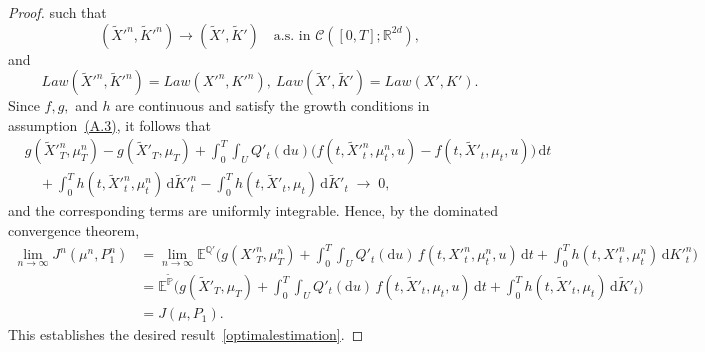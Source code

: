 \documentclass[10pt,a4paper]{amsart}
\begin{document}
\begin{proof}
such that
\begin{equation*}
(\tilde{X}'^n, \tilde{K}'^n)
\to
(\tilde{X}', \tilde{K}')
\quad 
\text{a.s. in } 
\mathcal{C}([0,T]; \mathbb{R}^{2d}),
\end{equation*}
and
\begin{equation*}
Law(\tilde{X}'^n, \tilde{K}'^n)
= 
Law(X'^n, K'^n),
\ 
Law(\tilde{X}', \tilde{K}')
= 
Law(X', K').
\end{equation*}
Since $ f, g, $ and $ h $ are continuous and satisfy the growth conditions in assumption~\hyperlink{A.3}{(A.3)}, 
it follows that
\begin{align*}
& g(\tilde{X}'^n_T, \mu^n_T) - g(\tilde{X}'_T, \mu_T)
+ 
\int_0^T\int_U 
Q'_t(\mathrm{d}u)
\big(f(t, \tilde{X}'^n_t, \mu^n_t, u)
    - f(t, \tilde{X}'_t, \mu_t, u)\big)\,\mathrm{d}t
\\
&\quad 
+ 
\int_0^T 
h(t, \tilde{X}'^n_t, \mu^n_t)\,\mathrm{d}\tilde{K}'^n_t
- 
\int_0^T 
h(t, \tilde{X}'_t, \mu_t)\,\mathrm{d}\tilde{K}'_t
\;\longrightarrow\; 0,
\end{align*}
and the corresponding terms are uniformly integrable. 
Hence, by the dominated convergence theorem,
\begin{align*}
\lim_{n \to \infty} J^n(\mu^n, P^n_1)
&= 
\lim_{n \to \infty}
\mathbb{E}^{\mathbb{Q}'}
\Bigg(
g(X'^n_T, \mu^n_T)
+ 
\int_0^T\int_U 
Q'_t(\mathrm{d}u)\,
f(t, X'^n_t, \mu^n_t, u)\,\mathrm{d}t
+ 
\int_0^T 
h(t, X'^n_t, \mu^n_t)\,
\mathrm{d}K'^n_t
\Bigg)
\\[3pt]
&= 
\mathbb{E}^{\tilde{\mathbb{P}}}
\Bigg(
g(\tilde{X}'_T, \mu_T)
+ 
\int_0^T \int_U 
Q'_t(\mathrm{d}u)\,
f(t, \tilde{X}'_t, \mu_t, u)\,\mathrm{d}t
+ 
\int_0^T 
h(t, \tilde{X}'_t, \mu_t)\,
\mathrm{d}\tilde{K}'_t
\Bigg)
\\[3pt]
&= 
J(\mu, P_1).
\end{align*}
This establishes the desired result~\eqref{optimalestimation}.
\end{proof}
\end{document}
